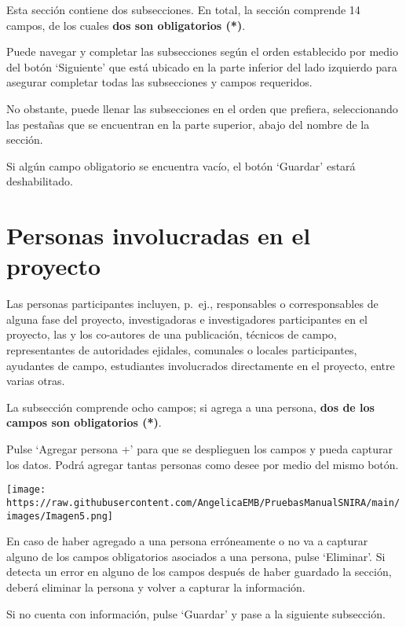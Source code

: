 \documentclass[
]{book}
\begin{document}
Esta sección contiene dos subsecciones.
En total, la sección comprende 14 campos, de los cuales \textbf{dos son obligatorios ({*})}.

Puede navegar y completar las subsecciones según el orden establecido por medio del botón `Siguiente' que está ubicado en la parte inferior del lado izquierdo para asegurar completar todas las subsecciones y campos requeridos.

No obstante, puede llenar las subsecciones en el orden que prefiera, seleccionando las pestañas que se encuentran en la parte superior, abajo del nombre de la sección.

Si algún campo obligatorio se encuentra vacío, el botón `Guardar' estará deshabilitado.

\hypertarget{personas-involucradas-en-el-proyecto}{%
\chapter*{Personas involucradas en el proyecto}\label{personas-involucradas-en-el-proyecto}}

Las personas participantes incluyen, p.~ej., responsables o corresponsables de alguna fase del proyecto, investigadoras e investigadores participantes en el proyecto, las y los co-autores de una publicación, técnicos de campo, representantes de autoridades ejidales, comunales o locales participantes, ayudantes de campo, estudiantes involucrados directamente en el proyecto, entre varias otras.

La subsección comprende ocho campos; si agrega a una persona,
\textbf{dos de los campos son obligatorios ({*})}.

Pulse `Agregar persona +' para que se desplieguen los campos y pueda capturar los datos. Podrá agregar tantas personas como desee por medio del mismo botón.

\texttt{[image: https://raw.githubusercontent.com/AngelicaEMB/PruebasManualSNIRA/main/images/Imagen5.png]}

En caso de haber agregado a una persona erróneamente o no va a capturar alguno de los campos obligatorios asociados a una persona, pulse `Eliminar'. Si detecta un error en alguno de los campos después de haber guardado la sección, deberá eliminar la persona y volver a capturar la información.

Si no cuenta con información, pulse `Guardar' y pase a la siguiente subsección.
\end{document}
